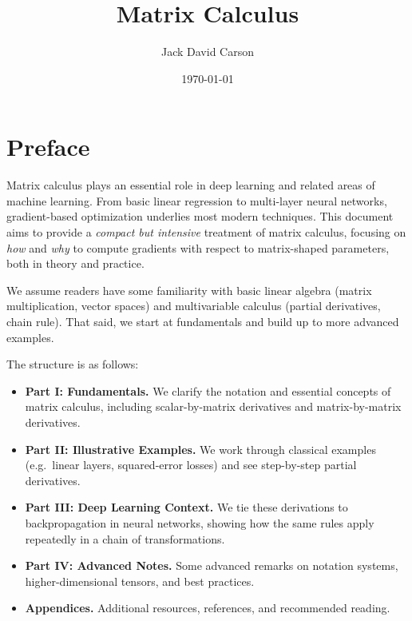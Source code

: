 \documentclass[11pt]{article}
\title{\textbf{Matrix Calculus}}
\author{Jack David Carson}
\date{\today}
\begin{document}
\maketitle
\tableofcontents
\vspace{1cm}

\section*{Preface}
Matrix calculus plays an essential role in deep learning and related areas of machine learning. 
From basic linear regression to multi-layer neural networks, 
gradient-based optimization underlies most modern techniques. 
This document aims to provide a \emph{compact but intensive} treatment of matrix calculus, 
focusing on \emph{how} and \emph{why} to compute gradients with respect to matrix-shaped parameters, 
both in theory and practice.

We assume readers have some familiarity with basic linear algebra (matrix multiplication, vector spaces) 
and multivariable calculus (partial derivatives, chain rule). 
That said, we start at fundamentals and build up to more advanced examples. 

The structure is as follows:
\begin{itemize}[leftmargin=2em]
    \item \textbf{Part I: Fundamentals.} We clarify the notation and essential concepts of matrix calculus, 
    including scalar-by-matrix derivatives and matrix-by-matrix derivatives.

    \item \textbf{Part II: Illustrative Examples.} 
    We work through classical examples (e.g.\ linear layers, squared-error losses) and see 
    step-by-step partial derivatives. 

    \item \textbf{Part III: Deep Learning Context.} 
    We tie these derivations to backpropagation in neural networks, 
    showing how the same rules apply repeatedly in a chain of transformations.

    \item \textbf{Part IV: Advanced Notes.} Some advanced remarks on notation systems, 
    higher-dimensional tensors, and best practices.

    \item \textbf{Appendices.} Additional resources, references, and recommended reading. 
\end{itemize}

\newpage
\end{document}
